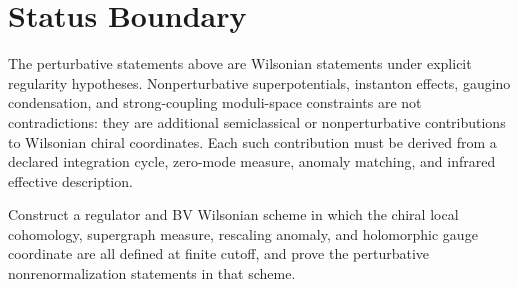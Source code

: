 \section{Status Boundary}

The perturbative statements above are Wilsonian statements under explicit
regularity hypotheses.  Nonperturbative superpotentials, instanton effects,
gaugino condensation, and strong-coupling moduli-space constraints are not
contradictions: they are additional semiclassical or nonperturbative
contributions to Wilsonian chiral coordinates.  Each such contribution must
be derived from a declared integration cycle, zero-mode measure, anomaly
matching, and infrared effective description.

\begin{openproblem}
\label{op:rigorous-susy-holomorphy}
Construct a regulator and BV Wilsonian scheme in which the chiral local
cohomology, supergraph measure, rescaling anomaly, and holomorphic gauge
coordinate are all defined at finite cutoff, and prove the perturbative
nonrenormalization statements in that scheme.
\end{openproblem}
